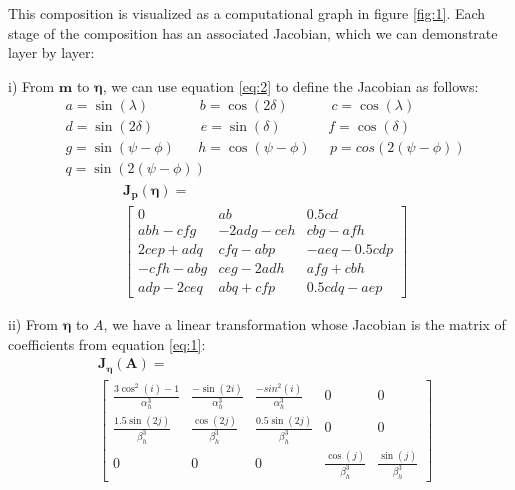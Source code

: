 \documentclass[preprint]{seismica}
\begin{document}
    \noindent This composition is visualized as a computational graph in figure \ref{fig:1}.
    Each stage of the composition has an associated Jacobian, which we can demonstrate layer by layer:
    
    i) From $\bm{m}$ to $\bm{\eta}$, we can use equation \ref{eq:2} to define the Jacobian
    as follows:
    \begin{align*}
      &a = \sin(\lambda)\;\;\;\;\;\;\;\;\;\;\;\;\; b = \cos(2\delta)\;\;\;\;\;\;\;\;\;\;\; c = \cos(\lambda)\\
      &d = \sin(2\delta)\;\;\;\;\;\;\;\;\;\;\;\; e = \sin(\delta)\;\;\;\;\;\;\;\;\;\;\;\; f = \cos(\delta)\\
      &g = \sin(\psi - \phi)\;\;\;\;\;\; h = \cos(\psi - \phi)\;\;\;\;\; p = cos(2(\psi - \phi))\\
      &q = \sin(2(\psi - \phi))
    \end{align*}
    \begin{align} \label{eq:18}
      \nonumber&\bm{J_p}(\bm{\eta}) = \\
      &\begin{bmatrix}
        0         &ab         &0.5cd\\
        abh-cfg   &-2adg-ceh  &cbg-afh\\
        2cep+adq  &cfq-abp    &-aeq-0.5cdp\\
        -cfh-abg  &ceg-2adh   &afg+cbh\\
        adp-2ceq  &abq+cfp    &0.5cdq-aep
      \end{bmatrix}
    \end{align}

    ii) From $\bm{\eta}$ to $A$, we have a linear transformation whose Jacobian is the matrix
    of coefficients from equation \ref{eq:1}:
    \begin{align} \label{eq:19}
      \nonumber&\bm{J_\eta}(\bm{A}) = \\
      &\begin{bmatrix}
        \frac{3\cos^2(i)-1}{\alpha_h^3}    &\frac{-\sin(2i)}{\alpha_h^3}    &\frac{-sin^2(i)}{\alpha_h^3}   &0    &0\\
        \frac{1.5\sin(2j)}{\beta_h^3}      &\frac{\cos(2j)}{\beta_h^3}      &\frac{0.5\sin(2j)}{\beta_h^3}  &0    &0\\
        0         &0           &0        &\frac{\cos(j)}{\beta_h^3}       &\frac{\sin(j)}{\beta_h^3}
      \end{bmatrix}
    \end{align}
\end{document}
